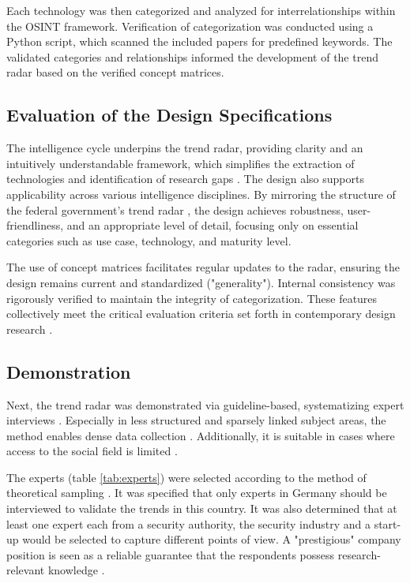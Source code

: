 \documentclass[10pt]{article}
\begin{document}
Each technology was then categorized and analyzed for interrelationships within the OSINT framework. Verification of categorization was conducted using a Python script, which scanned the included papers for predefined keywords. The validated categories and relationships informed the development of the trend radar based on the verified concept matrices.


\subsection{Evaluation of the Design Specifications}

The intelligence cycle underpins the trend radar, providing clarity and an intuitively understandable framework, which simplifies the extraction of technologies and identification of research gaps \cite{Breakspear.2013}. The design also supports applicability across various intelligence disciplines. By mirroring the structure of the federal government's trend radar \cite{Stich.2022}, the design achieves robustness, user-friendliness, and an appropriate level of detail, focusing only on essential categories such as use case, technology, and maturity level.

The use of concept matrices facilitates regular updates to the radar, ensuring the design remains current and standardized ("generality"). Internal consistency was rigorously verified to maintain the integrity of categorization. These features collectively meet the critical evaluation criteria set forth in contemporary design research \cite{vomBrocke.2020b}.


\subsection{Demonstration}

Next, the trend radar was demonstrated via guideline-based,
systematizing expert interviews \cite{Bogner.2014, Glaser.2009, Meuser.1991}.
Especially in less structured and sparsely linked subject areas, the method
enables dense data collection \cite{Bogner.2014,Meuser.1991}. Additionally,
it is suitable in cases where access to the social field is limited \cite{Bogner.2002c, Glaser.2009}.

The experts (table \ref{tab:experts}) were selected according to the method of
theoretical sampling \cite{Glaser.1967,Eisenhardt.1989}. It was specified that only experts in
Germany should be interviewed to validate the trends in this
country. It was also determined that at least one expert each
from a security authority, the security industry and a
start-up would be selected to capture different points of
view. A "prestigious" company position is seen as a reliable
guarantee that the respondents possess research-relevant knowledge \cite{Bogner.2002b}.
\end{document}
